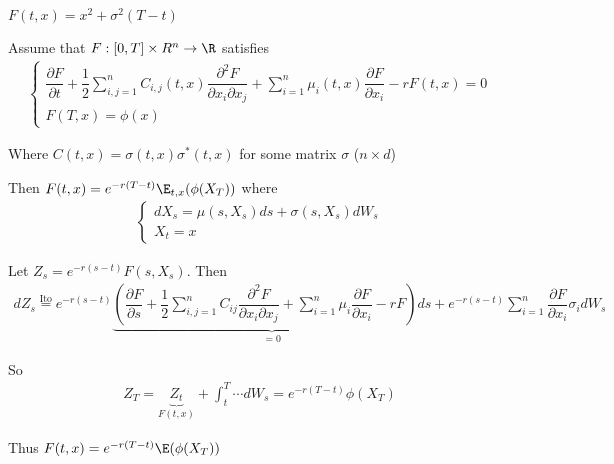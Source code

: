 \noindent $F(t,x) = x^2+\sigma^2(T-t)$
\par\bigskip
\begin{theo}{}
  Assume that $F:[0,T]\times R^n\to\R$ satisfies
  \begin{equation*}
    \begin{gathered}
      \begin{cases}
        \dfrac{\partial F}{\partial t}+ \dfrac{1}{2}\sum_{i,j=1}^{n}C_{i,j}(t,x)\dfrac{\partial^2 F}{\partial x_i\partial x_j}+\sum_{i=1}^{n}\mu_i(t,x)\dfrac{\partial F}{\partial x_i}-rF(t,x) = 0\\
        F(T,x)=  \phi(x)
      \end{cases}
    \end{gathered}
  \end{equation*}
  \par\bigskip
  \noindent Where $C(t,x) = \sigma(t,x)\sigma^*(t,x)$ for some matrix $\sigma$ ($n\times d$)\par
  \noindent Then $F(t,x) = e^{-r(T-t)}\E_{t,x}(\phi(X_T))$ where
  \begin{equation*}
    \begin{gathered}
      \begin{cases}
        dX_s = \mu(s,X_s)ds+\sigma(s,X_s)dW_s\\
        X_t = x
      \end{cases}
    \end{gathered}
  \end{equation*}
\end{theo}
\par\bigskip
\begin{prf}[]{}
  Let $Z_s = e^{-r(s-t)}F(s,X_s)$. Then 
  \begin{equation*}
    \begin{gathered}
      dZ_s \stackrel{\text{Ito}}{=} e^{-r(s-t)}\underbrace{\left(\dfrac{\partial F}{\partial s}+\dfrac{1}{2}\sum_{i,j=1}^{n}C_{ij}\dfrac{\partial^2 F}{\partial x_i\partial x_j}+\sum_{i=1}^{n}\mu_i\dfrac{\partial F}{\partial x_i}-rF\right)ds}_{=0}+e^{-r(s-t)}\sum_{i=1}^{n}\dfrac{\partial F}{\partial x_i}\sigma_i dW_s
    \end{gathered}
  \end{equation*}
  \par\bigskip
  \noindent So
  \begin{equation*}
    \begin{gathered}
      Z_T = \underbrace{Z_t}_{F(t,x)}+\int_{t}^{T}\cdots dW_s = e^{-r(T-t)}\phi(X_T)
    \end{gathered}
  \end{equation*}
  \par\bigskip
  \noindent Thus $F(t,x) = e^{-r(T-t)}\E(\phi(X_T))$
\end{prf}
